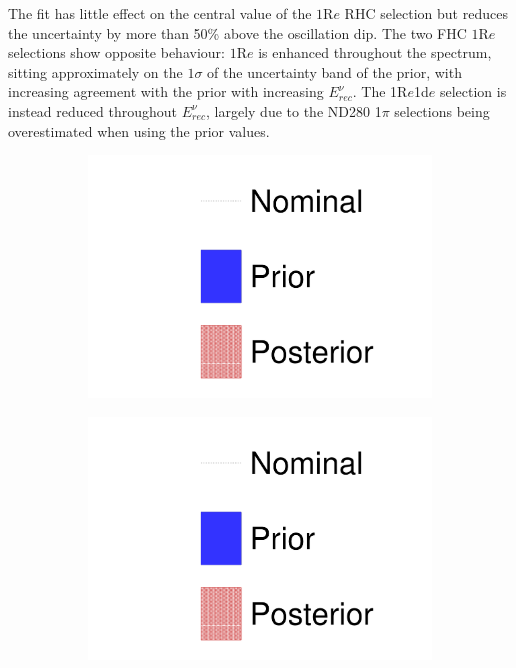 The fit has little effect on the central value of the $1\text{R}e$ RHC selection but reduces the uncertainty by more than 50\% above the oscillation dip. The two FHC $1\text{R}e$ selections show opposite behaviour: $1\text{R}e$ is enhanced throughout the spectrum, sitting approximately on the $1\sigma$ of the uncertainty band of the prior, with increasing agreement with the prior with increasing $E^\nu_{rec}$. The 1R$e$1d$e$ selection is instead reduced throughout $E^\nu_{rec}$, largely due to the ND280 1$\pi$ selections being overestimated when using the prior values.
\begin{figure}[h]
	\begin{subfigure}[t]{0.32\textwidth}
		\includegraphics[width=\textwidth, trim={0mm 0mm 0mm 0mm}, clip, page=1]{figures/mach3/data/prior_error_1june_try_2017_fit_on_sk_spectra}
	\end{subfigure}
	\begin{subfigure}[t]{0.32\textwidth}
		\includegraphics[width=\textwidth, trim={0mm 0mm 0mm 0mm}, clip, page=5]{figures/mach3/data/prior_error_1june_try_2017_fit_on_sk_spectra}

\end{subfigure}
\end{figure}
